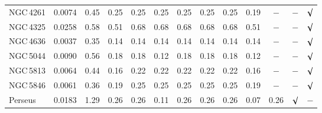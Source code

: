 \documentclass{aa}
\begin{document}
\begin{table}[!]
\begin{centering}
\begin{tabular}{l c c c c c c c c c c c c}
NGC\,4261 &   0.0074 & 0.45 & 0.25 & 0.25 & 0.25 & 0.25 & 0.25 & 0.25 & 0.19 & $-$ & $-$ & $\surd$ \\

NGC\,4325 &   0.0258 & 0.58 & 0.51 & 0.68 & 0.68 & 0.68 & 0.68 & 0.68 & 0.51 & $-$ & $-$ & $\surd$ \\

NGC\,4636 &   0.0037 & 0.35 &0.14 & 0.14 & 0.14 & 0.14 & 0.14 & 0.14 & 0.14 & $-$ & $-$ & $\surd$ \\

NGC\,5044 &   0.0090 & 0.56 & 0.18 & 0.18 & 0.12 & 0.18 & 0.18 & 0.18 & 0.12 & $-$ & $-$ & $\surd$ \\

NGC\,5813 &   0.0064 & 0.44 & 0.16 & 0.22 & 0.22 & 0.22 & 0.22 & 0.22 & 0.16 & $-$ & $-$ & $\surd$ \\

NGC\,5846 &   0.0061 & 0.36 & 0.19 & 0.25 & 0.25 & 0.25 & 0.25 & 0.25 & 0.19 & $-$ & $-$ & $\surd$ \\

Perseus &   0.0183 & 1.29 & 0.26 & 0.26 & 0.11 & 0.26 & 0.26 & 0.26 & 0.07 & 0.26 & $\surd$ & $-$ \\


\hline                                   
\end{tabular}
\par\end{centering}

\end{table}
\end{document}
